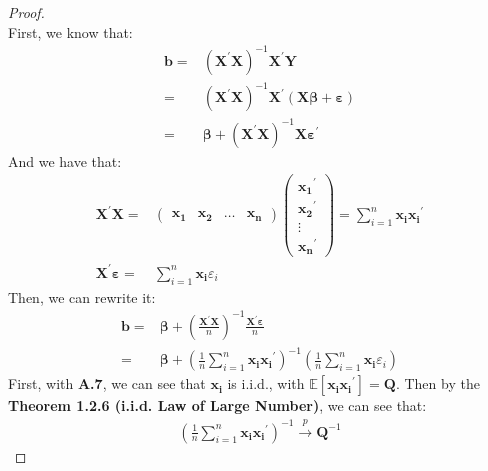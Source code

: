 \documentclass{article}
\begin{document}
	\begin{proof}
		\mbox{}\\
		First, we know that:
			\begin{align*}
				\boldsymbol{b} = &(\boldsymbol{X}^\prime \boldsymbol{X})^{-1} \boldsymbol{X}^\prime \boldsymbol{Y}\\
				= &(\boldsymbol{X}^\prime \boldsymbol{X})^{-1} \boldsymbol{X}^\prime (\boldsymbol{X} \boldsymbol{\beta} + \boldsymbol{\varepsilon})\\
				= &\boldsymbol{\beta} + (\boldsymbol{X}^\prime \boldsymbol{X})^{-1} \boldsymbol{X} \boldsymbol{\varepsilon}^\prime
			\end{align*}
		And we have that:
			\begin{align*}
				\boldsymbol{X}^\prime \boldsymbol{X} = 
				&\begin{pmatrix}
					\boldsymbol{x_1} & \boldsymbol{x_2} & \ldots & \boldsymbol{x_n}
				\end{pmatrix}
				\begin{pmatrix}
					\boldsymbol{x_1}^\prime\\
					\boldsymbol{x_2}^\prime\\
					\vdots\\
					\boldsymbol{x_n}^\prime
				\end{pmatrix} = \sum\limits^n_{i=1} \boldsymbol{x_i} \boldsymbol{x_i}^\prime\\
				\boldsymbol{X}^\prime \boldsymbol{\varepsilon} = &\sum\limits^n_{i=1} \boldsymbol{x_i} \varepsilon_i
			\end{align*}
			Then, we can rewrite it:
				\begin{align*}
					\boldsymbol{b} = &\boldsymbol{\beta} + \left( \frac{\boldsymbol{X}^\prime \boldsymbol{X}}{n} \right)^{-1} \frac{\boldsymbol{X}^\prime \boldsymbol{\varepsilon}}{n}\\
					= &\boldsymbol{\beta} + \left( \frac{1}{n} \sum\limits^n_{i=1} \boldsymbol{x_i} \boldsymbol{x_i}^\prime \right)^{-1} \left( \frac{1}{n} \sum\limits^n_{i=1} \boldsymbol{x_i} \varepsilon_i \right)
				\end{align*}
			First, with \textbf{A.7}, we can see that $\boldsymbol{x_i}$ is i.i.d., with $\mathbb{E}[\boldsymbol{x_i}\boldsymbol{x_i}^\prime] = \boldsymbol{Q}$. Then by the \textbf{Theorem 1.2.6 (i.i.d. Law of Large Number)}, we can see that:
				\begin{align*}
					\left( \frac{1}{n} \sum\limits^n_{i=1} \boldsymbol{x_i} \boldsymbol{x_i}^\prime \right)^{-1} \xrightarrow{p} \boldsymbol{Q}^{-1}
				\end{align*}

\end{proof}
\end{document}
